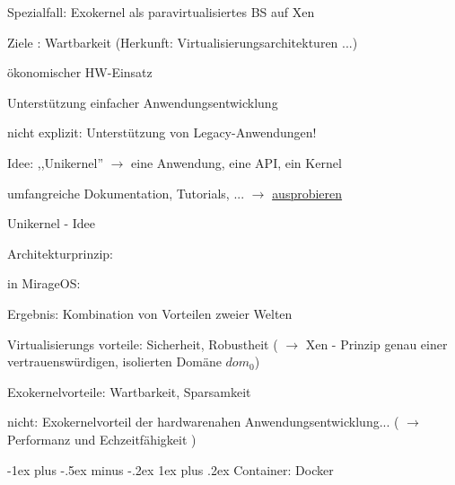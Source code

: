 \documentclass[a4paper]{article}
\makeatletter
\renewcommand{\subsubsection}{\@startsection{subsubsection}{3}{0mm}%
 {-1ex plus -.5ex minus -.2ex}%
 {1ex plus .2ex}%
 {\normalfont\small\bfseries}}
\makeatother
\begin{document}
\begin{multicols}{3}
    \begin{itemize*}
        \item Spezialfall: Exokernel als paravirtualisiertes BS auf Xen
        \item Ziele : Wartbarkeit (Herkunft: Virtualisierungsarchitekturen ...)
        \begin{itemize*}
            \item ökonomischer HW-Einsatz
            \item Unterstützung einfacher Anwendungsentwicklung
            \item nicht explizit: Unterstützung von Legacy-Anwendungen!
        \end{itemize*}
        \item Idee: ,,Unikernel'' $\rightarrow$ eine Anwendung, eine
        API, ein Kernel
        \item umfangreiche Dokumentation, Tutorials, ...
        $\rightarrow$
        \href{https://mirage.io/wiki/learning}{ausprobieren}
        \item Unikernel - Idee
        \begin{itemize*}
            \item Architekturprinzip: %
            \item in MirageOS: %
        \end{itemize*}
        \item Ergebnis: Kombination von Vorteilen zweier Welten
        \begin{itemize*}
            \item Virtualisierungs vorteile: Sicherheit, Robustheit ( $\rightarrow$ Xen - Prinzip genau einer vertrauenswürdigen, isolierten Domäne $dom_0$)
            \item Exokernelvorteile: Wartbarkeit, Sparsamkeit
            \item nicht: Exokernelvorteil der hardwarenahen Anwendungsentwicklung... ( $\rightarrow$ Performanz und Echzeitfähigkeit )
        \end{itemize*}
    \end{itemize*}


    \subsubsection{Container: Docker}


\end{multicols}
\end{document}
